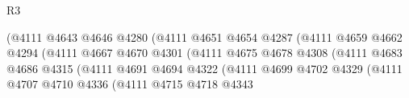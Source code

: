 \begin{lexlean}{R3}
\begin{coremodule}
                                                  (@4111
                                                    @4643
                                                    @4646
                                                    @4280
                                                    (@4111
                                                      @4651
                                                      @4654
                                                      @4287
                                                      (@4111
                                                        @4659
                                                        @4662
                                                        @4294
                                                        (@4111
                                                          @4667
                                                          @4670
                                                          @4301
                                                          (@4111
                                                            @4675
                                                            @4678
                                                            @4308
                                                            (@4111
                                                              @4683
                                                              @4686
                                                              @4315
                                                              (@4111
                                                                @4691
                                                                @4694
                                                                @4322
                                                                (@4111
                                                                  @4699
                                                                  @4702
                                                                  @4329
                                                                  (@4111
                                                                    @4707
                                                                    @4710
                                                                    @4336
                                                                    (@4111
                                                                      @4715
                                                                      @4718
                                                                      @4343

\end{coremodule}
\end{lexlean}
